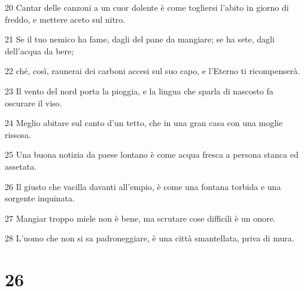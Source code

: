 \par 20 Cantar delle canzoni a un cuor dolente è come togliersi l'abito in giorno di freddo, e mettere aceto sul nitro.
\par 21 Se il tuo nemico ha fame, dagli del pane da mangiare; se ha sete, dagli dell'acqua da bere;
\par 22 ché, così, raunerai dei carboni accesi sul suo capo, e l'Eterno ti ricompenserà.
\par 23 Il vento del nord porta la pioggia, e la lingua che sparla di nascosto fa oscurare il viso.
\par 24 Meglio abitare sul canto d'un tetto, che in una gran casa con una moglie rissosa.
\par 25 Una buona notizia da paese lontano è come acqua fresca a persona stanca ed assetata.
\par 26 Il giusto che vacilla davanti all'empio, è come una fontana torbida e una sorgente inquinata.
\par 27 Mangiar troppo miele non è bene, ma scrutare cose difficili è un onore.
\par 28 L'uomo che non si sa padroneggiare, è una città smantellata, priva di mura.

\chapter{26}

